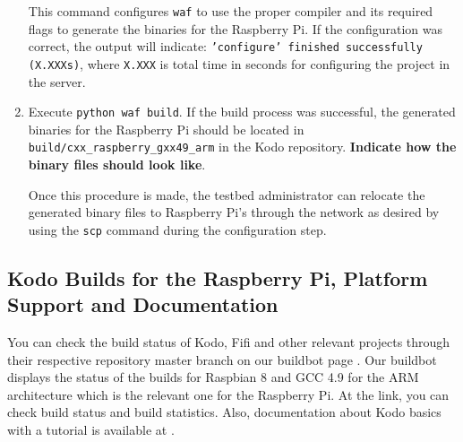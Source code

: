 \begin{enumerate}
This command configures \texttt{waf} to use the proper compiler and its
required flags to generate the binaries for the Raspberry Pi. If the
configuration was correct, the output will indicate:
\texttt{'configure' finished successfully (X.XXXs)}, where \texttt{X.XXX}
is total time in seconds for configuring the project in the server. \\

\item Execute \texttt{python waf build}. If the build process was
successful, the generated binaries for the Raspberry Pi should be located
in \texttt{build/cxx\_raspberry\_gxx49\_arm} in the Kodo repository.
\textbf{Indicate how the binary files should look like}.

Once this procedure is made, the testbed administrator can relocate the
generated binary files to Raspberry Pi's through the network as desired
by using the \texttt{scp} command during the configuration step.


\end{enumerate}

\subsection{Kodo Builds for the Raspberry Pi, Platform Support and Documentation}

You can check the build status of Kodo, Fifi and other relevant projects through
their respective repository master branch on our buildbot page
\cite{steinwurf2016buildbot}. Our buildbot displays the status of the builds for
Raspbian 8 and GCC 4.9 for the ARM architecture which is the relevant one for the
Raspberry Pi. At the link, you can check build status and build statistics. Also,
documentation about Kodo basics with a tutorial is available at \cite{kododocs}.
